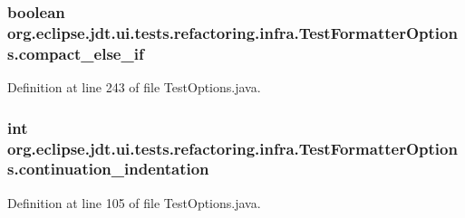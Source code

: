 \hypertarget{classorg_1_1eclipse_1_1jdt_1_1ui_1_1tests_1_1refactoring_1_1infra_1_1TestFormatterOptions_a18df725d30b838eb919dd69adf29195e}{
\subsubsection[{compact\_\-else\_\-if}]{\setlength{\rightskip}{0pt plus 5cm}boolean {\bf org.eclipse.jdt.ui.tests.refactoring.infra.TestFormatterOptions.compact\_\-else\_\-if}}}
\label{classorg_1_1eclipse_1_1jdt_1_1ui_1_1tests_1_1refactoring_1_1infra_1_1TestFormatterOptions_a18df725d30b838eb919dd69adf29195e}


Definition at line 243 of file TestOptions.java.

\hypertarget{classorg_1_1eclipse_1_1jdt_1_1ui_1_1tests_1_1refactoring_1_1infra_1_1TestFormatterOptions_abeaceeffa454c0bde289a9a4de2d82c0}{
\subsubsection[{continuation\_\-indentation}]{\setlength{\rightskip}{0pt plus 5cm}int {\bf org.eclipse.jdt.ui.tests.refactoring.infra.TestFormatterOptions.continuation\_\-indentation}}}
\label{classorg_1_1eclipse_1_1jdt_1_1ui_1_1tests_1_1refactoring_1_1infra_1_1TestFormatterOptions_abeaceeffa454c0bde289a9a4de2d82c0}


Definition at line 105 of file TestOptions.java.

